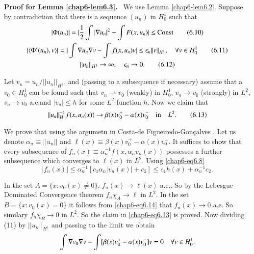 \noindent
{\bf Proof for Lemma \ref{chap6-lem6.3}.}~ We use Lemma
\ref{chap6-lem6.2}. Suppose by contradiction that there is a sequence
$(u_{n})$ in $H^{1}_{0}$ such that
\begin{gather*}
|\Phi(u_{n})|=|\frac{1}{2}\int|\nabla u_{n}|^{2}-\int F(x,u_{n})|\leq
\text{Const}\tag{6.10}\label{chap6-eq6.10}\\ 
|\langle\Phi'(u_{n}),v\rangle|=|\int \nabla u_{n}\nabla v-\int
f(x,u_{n})v|\leq \epsilon_{n}||v||_{H^{1}},\quad \forall v\in
H^{1}_{0}\tag{6.11}\label{chap6-eq6.11}\\
||u_{n}||_{H^{1}}\to \infty,\quad \epsilon_{n}\to
0.\tag{6.12}\label{chap6-eq6.12} 
\end{gather*}\pageoriginale

Let $v_{n}=u_{n}/||u_{n}||_{H^{1}}$, and (passing to a subsequence if
necessary) assume that a $v_{0}\in H^{1}_{0}$ can be found such that
$v_{n}\rightharpoonup v_{0}$ (weakly) in $H^{1}_{0}$, $v_{n}\to v_{0}$
(strongly) in $L^{2}$, $v_{n}\to v_{0}$ a.e.\@ and $|v_{n}|\leq h$ for
  some $L^{2}$-function $h$. Now we claim that
\begin{equation*}
||u_{n}||^{-1}_{H_{1}}f(x,u_{n}(x))\to
\beta(x)v^{+}_{0}-\alpha(x)v^{-}_{0}\quad \text{in}\quad
L^{2}.\tag{6.13}\label{chap6-eq6.13} 
\end{equation*}

We prove that using the argumetn in Costa-de Figueiredo-Gon\c{c}alves
\cite{key27}. Let us denote $\alpha_{n}\equiv ||u_{n}||$ and
$\ell(x)\equiv \beta(x)v^{+}_{0}-\alpha(x)v^{-}_{0}$. It suffices to
show that every subsequence of $f_{n}(x)\equiv
\alpha^{-1}_{n}f(x,\alpha_{n}v_{n}(x))$ possesses a further
subsequence which converges to $\ell(x)$ in $L^{2}$. Using
\eqref{chap6-eq6.8} 
\begin{equation*}
|f_{n}(x)|\leq \alpha^{-1}_{n}[c_{1}\alpha_{n}|v_{n}(x)|+c_{2}]\leq
c_{1}h(x)+\alpha^{-1}_{n}c_{2}.\tag{6.14}\label{chap6-eq6.14} 
\end{equation*}

In the set $A=\{x:v_{0}(x)\neq 0\}$, $f_{n}(x)\to \ell (x)$ a.e.. So
by the Lebesgue Dominated Convergence theorem $f_{n}\chi_{A}\to \ell$
in $L^{2}$. In the set $B=\{x:v_{0}(x)=0\}$ it follows from
\eqref{chap6-eq6.14} that $f_{n}(x)\to 0$ a.e. So similary
$f_{n}\chi_{B}\to 0$ in $L^{2}$. So the claim in \eqref{chap6-eq6.13}
is proved. Now dividing (11) by $||u_{n}||_{H^{1}}$ and passing to the
limit we obtain
$$
\int\nabla v_{0}\nabla
v-\int[\beta(x)v^{+}_{0}-\alpha(x)v^{-}_{0}]v=0\quad\forall v\in
H^{1}_{0}.
$$

